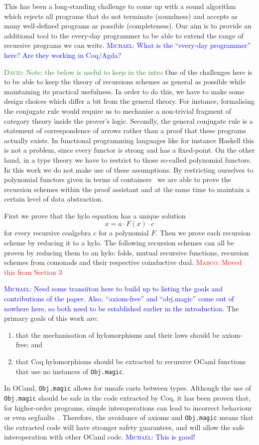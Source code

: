 \documentclass[a4paper, UKenglish, cleveref, autoref, thm-restate]{lipics-v2021}
\newcommand{\mpav}[1]{\textcolor{red}{\textsc{Marco}: #1}}
\newcommand{\dcas}[1]{\textcolor{ForestGreen}{\textsc{David}: #1}}
\newcommand{\mvol}[1]{\textcolor{blue}{\textsc{Michael}: #1}}
\newcommand{\comp}{\cdot}
\begin{document}
This has been a long-standing challenge to come up with a sound algorithm which
rejects all programs that do not terminate (soundness) and accepts as many
well-defined programs as possible (completeness). Our aim is to provide an
additional tool to the every-day programmer to be able to extend the range of
recursive programs we can write.
\mvol{What is the ``every-day programmer'' here? Are they working in Coq/Agda?}

\dcas{Note: the below is useful to keep in the intro}
One of the challenges here is to be able to keep the theory of recursions
schemes as general as possible while maintaining its practical usefulness. In
order to do this, we have to make some design choices which differ a bit from
the general theory.  For instance, formalising the conjugate rule would require
us to mechanise a non-trivial fragment of category theory inside the prover's
logic.  Secondly, the general conjugate rule is a statement of correspondence of
arrows rather than a proof that these programs actually exists. In functional
programming languages like for instance Haskell this is not a problem, since
every functor is strong and has a fixed-point.  On the other hand, in a type
theory we have to restrict to those so-called polynomial functors. In this work
we do not make use of these assumptions. By restricting ourselves to polynomial
functors given in terms of containers~\cite{AbbottAG05} we are able to prove the
recursion schemes within the proof assistant and at the same time to maintain a
certain level of data abstraction.

First we prove that the hylo equation has a unique solution
\[
  x = a \comp F(x) \comp c
\]
for every recursive coalgebra $c$ for a polynomial $F$. Then we prove each
recursion scheme by reducing it to a hylo. The following recursion schemes can
all be proven by reducing them to an hylo: folds, mutual recursive functions,
recursion schemes from comonads and their respective coinductive dual.
\mpav{Moved this from Section 3}

\mvol{Need some transiiton here to build up to listing the goals and contributions of the paper. Also, ``axiom-free'' and ``obj.magic'' come out of nowhere here, so both need to be established earlier in the introduction.}
The primary goals of this work are:
\begin{enumerate}
  \item that the
  mechanisation of hylomorphisms and their laws should be axiom-free; and
  \item that Coq
hylomorphisms should be extracted to recursive OCaml functions that use no
instances of \texttt{Obj.magic}.
\end{enumerate}
In OCaml, \texttt{Obj.magic} allows for unsafe casts between types.
Although the use of \texttt{Obj.magic} should be safe in the code
extracted by Coq, it has been proven that, for higher-order programs, simple
interoperations can lead to incorrect behaviour or even
segfaults~\cite{forster:hal-04329663}. Therefore, the avoidance of axioms and
\texttt{Obj.magic} means that the extracted code will have stronger
safety guarantees, and will allow the safe interoperation with other OCaml code.
\mvol{This is good!}
\end{document}
